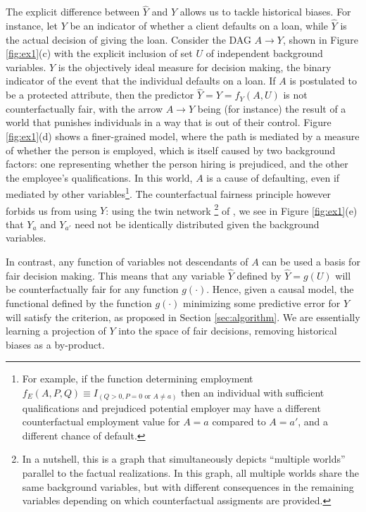  The explicit difference between $\hat Y$ and $Y$
allows us to tackle historical biases. For instance, let $Y$ be an
indicator of whether a client defaults on a loan, while $\hat Y$ is
the actual decision of giving the loan. Consider the DAG $A
\rightarrow Y$, shown in Figure \ref{fig:ex1}(c) with the explicit
inclusion of set $U$ of independent background variables. $Y$ is the
objectively ideal measure for decision making, the binary indicator of
the event that the individual defaults on a loan. If $A$ is postulated
to be a protected attribute, then the predictor $\hat Y = Y = f_Y(A,
U)$ is not counterfactually fair, with the arrow $A \rightarrow Y$
being (for instance) the result of a world that punishes individuals
in a way that is out of their control. Figure \ref{fig:ex1}(d) shows a
finer-grained model, where the path is mediated by a measure of
whether the person is employed, which is itself caused by two
background factors: one representing whether the person hiring is
prejudiced, and the other the employee's qualifications. In this
world, $A$ is a cause of defaulting, even if mediated by other
variables\footnote{For example, if the function determining employment
  $f_E(A,P,Q) \equiv I_{(Q > 0, P = 0 \text{ or } A \neq a)}$ then an
  individual with sufficient qualifications and prejudiced potential
  employer may have a different counterfactual employment value for $A
  = a$ compared to $A = a'$, and a different chance of default. }. The
counterfactual fairness principle however forbids us from using $Y$:
using the twin network
\footnote{In a nutshell, this is a graph that simultaneously depicts
  ``multiple worlds'' parallel to the factual realizations. In
  this graph, all multiple worlds share the same background variables,
  but with different consequences in the remaining variables depending
  on which counterfactual assigments are provided.} of
\citet{pearl:00}, we see in Figure \ref{fig:ex1}(e) that $Y_a$ and
$Y_{a'}$ need not be identically distributed given the background
variables.

In contrast, any function of variables not descendants of $A$ can be
used a basis for fair decision making. This means that any variable
$\hat Y$ defined by $\hat Y = g(U)$ will be counterfactually fair for
any function $g(\cdot)$. Hence, given a causal model, the functional
defined by the function $g(\cdot)$ minimizing some predictive error
for $Y$ will satisfy the criterion, as proposed in Section
\ref{sec:algorithm}. We are essentially learning a projection of $Y$
into the space of fair decisions, removing historical biases as a
by-product.

